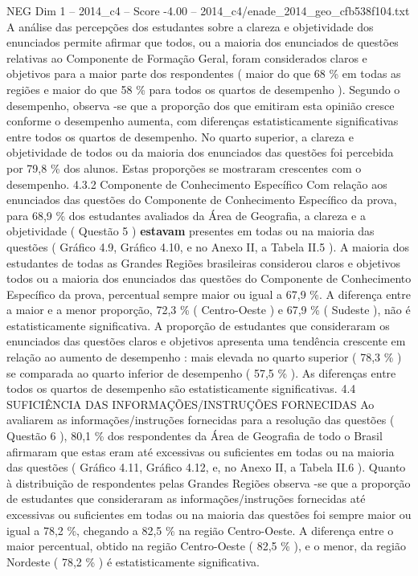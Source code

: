\begin{textsample}{NEG Dim 1 – 2014\_c4 – Score -4.00 – 2014\_c4/enade\_2014\_geo\_cfb538f104.txt}
A análise das percepções dos estudantes sobre a clareza e objetividade dos enunciados permite afirmar que todos, ou a maioria dos enunciados de questões relativas ao Componente de Formação Geral, foram considerados claros e objetivos para a maior parte dos respondentes ( maior do que 68 \% em todas as regiões e maior do que 58 \% para todos os quartos de desempenho ).
Segundo o desempenho, observa -se que a proporção dos que emitiram esta opinião cresce conforme o desempenho aumenta, com diferenças estatisticamente significativas entre todos os quartos de desempenho.
No quarto superior, a clareza e objetividade de todos ou da maioria dos enunciados das questões foi percebida por 79,8 \% dos alunos.
Estas proporções se mostraram crescentes com o desempenho. 4.3.2 Componente de Conhecimento Específico Com relação aos enunciados das questões do Componente de Conhecimento Específico da prova, para 68,9 \% dos estudantes avaliados da Área de Geografia, a clareza e a objetividade ( Questão 5 ) \textbf{estavam} presentes em todas ou na maioria das questões ( Gráfico 4.9, Gráfico 4.10, e no Anexo II, a Tabela II.5 ).
A maioria dos estudantes de todas as Grandes Regiões brasileiras considerou claros e objetivos todos ou a maioria dos enunciados das questões do Componente de Conhecimento Específico da prova, percentual sempre maior ou igual a 67,9 \%.
A diferença entre a maior e a menor proporção, 72,3 \% ( Centro-Oeste ) e 67,9 \% ( Sudeste ), não é estatisticamente significativa.
A proporção de estudantes que consideraram os enunciados das questões claros e objetivos apresenta uma tendência crescente em relação ao aumento de desempenho : mais elevada no quarto superior ( 78,3 \% ) se comparada ao quarto inferior de desempenho ( 57,5 \% ).
As diferenças entre todos os quartos de desempenho são estatisticamente significativas. 4.4 SUFICIÊNCIA DAS INFORMAÇÕES/INSTRUÇÕES FORNECIDAS Ao avaliarem as informações/instruções fornecidas para a resolução das questões ( Questão 6 ), 80,1 \% dos respondentes da Área de Geografia de todo o Brasil afirmaram que estas eram até excessivas ou suficientes em todas ou na maioria das questões ( Gráfico 4.11, Gráfico 4.12, e, no Anexo II, a Tabela II.6 ).
Quanto à distribuição de respondentes pelas Grandes Regiões observa -se que a proporção de estudantes que consideraram as informações/instruções fornecidas até excessivas ou suficientes em todas ou na maioria das questões foi sempre maior ou igual a 78,2 \%, chegando a 82,5 \% na região Centro-Oeste.
A diferença entre o maior percentual, obtido na região Centro-Oeste ( 82,5 \% ), e o menor, da região Nordeste ( 78,2 \% ) é estatisticamente significativa.

\end{textsample}
